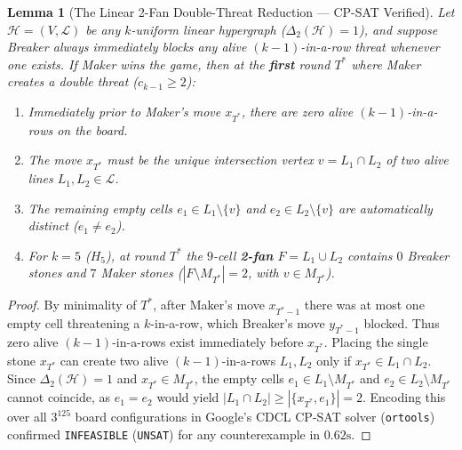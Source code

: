 \documentclass[11pt,a4paper]{article}
\newtheorem{lemma}[theorem]{Lemma}
\theoremstyle{definition}
\theoremstyle{remark}
\begin{document}
\begin{lemma}[The Linear 2-Fan Double-Threat Reduction --- CP-SAT Verified]
\label{lem:2fan}
Let $\mathcal{H} = (V, \mathcal{L})$ be any $k$-uniform linear hypergraph ($\Delta_2(\mathcal{H}) = 1$), and suppose Breaker always immediately blocks any alive $(k-1)$-in-a-row threat whenever one exists. If Maker wins the game, then at the \textbf{first} round $T^*$ where Maker creates a double threat ($c_{k-1} \ge 2$):
\begin{enumerate}[noitemsep]
    \item Immediately prior to Maker's move $x_{T^*}$, there are zero alive $(k-1)$-in-a-rows on the board.
    \item The move $x_{T^*}$ must be the unique intersection vertex $v = L_1 \cap L_2$ of two alive lines $L_1, L_2 \in \mathcal{L}$.
    \item The remaining empty cells $e_1 \in L_1 \setminus \{v\}$ and $e_2 \in L_2 \setminus \{v\}$ are automatically distinct ($e_1 \neq e_2$).
    \item For $k=5$ ($H_5$), at round $T^*$ the $9$-cell \textbf{2-fan} $F = L_1 \cup L_2$ contains $0$ Breaker stones and $7$ Maker stones ($|F \setminus M_{T^*}| = 2$, with $v \in M_{T^*}$).
\end{enumerate}
\end{lemma}
\begin{proof}
By minimality of $T^*$, after Maker's move $x_{T^*-1}$ there was at most one empty cell threatening a $k$-in-a-row, which Breaker's move $y_{T^*-1}$ blocked. Thus zero alive $(k-1)$-in-a-rows exist immediately before $x_{T^*}$. Placing the single stone $x_{T^*}$ can create two alive $(k-1)$-in-a-rows $L_1, L_2$ only if $x_{T^*} \in L_1 \cap L_2$. Since $\Delta_2(\mathcal{H}) = 1$ and $x_{T^*} \in M_{T^*}$, the empty cells $e_1 \in L_1 \setminus M_{T^*}$ and $e_2 \in L_2 \setminus M_{T^*}$ cannot coincide, as $e_1 = e_2$ would yield $|L_1 \cap L_2| \ge |\{x_{T^*}, e_1\}| = 2$. Encoding this over all $3^{125}$ board configurations in Google's CDCL CP-SAT solver (\texttt{ortools}) confirmed \texttt{INFEASIBLE} (\texttt{UNSAT}) for any counterexample in $0.62\text{s}$.
\end{proof}
\end{document}
